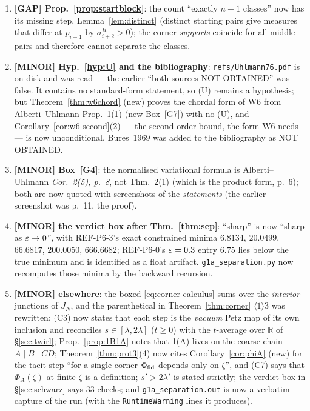 \documentclass[11pt]{article}
\newcommand{\Mob}{\operatorname{M\ddot ob}}
\theoremstyle{definition}\newtheorem{example}[theorem]{Example}
\begin{document}
\begin{enumerate}[leftmargin=2.2em]
 unitary on all of $H$ for every $g\in\Mob$ by Lemma~\ref{lem:moebius-inv}.
\item \textbf{[GAP] Prop.~\ref{prop:startblock}}: the count ``exactly $n-1$ classes'' now has its
 missing step, Lemma~\ref{lem:distinct} (distinct starting pairs give measures that differ at
 $p_{i+1}$ by $\sigma^R_{i+2}>0$); the corner \emph{supports} coincide for all middle pairs and
 therefore cannot separate the classes.
\item \textbf{[MINOR] Hyp.~\ref{hyp:U} and the bibliography}: \texttt{refs/Uhlmann76.pdf} is on
 disk and was read --- the earlier ``both sources NOT OBTAINED'' was false.  It contains no
 standard-form statement, so (U) remains a hypothesis; but Theorem~\ref{thm:w6chord} (new) proves
 the chordal form of W6 from Alberti--Uhlmann Prop.~1(1) (new Box~[G7]) with no (U), and
 Corollary~\ref{cor:w6-second}(2) --- the second-order bound, the form W6 needs --- is now
 unconditional.  Bures~1969 was added to the bibliography as NOT OBTAINED.
\item \textbf{[MINOR] Box~[G4]}: the normalised variational formula is Alberti--Uhlmann
 \emph{Cor.~2(5), p.~8}, not Thm.~2(1) (which is the product form, p.~6); both are now quoted with
 screenshots of the \emph{statements} (the earlier screenshot was p.~11, the proof).
\item \textbf{[MINOR] the verdict box after Thm.~\ref{thm:sep}}: ``sharp'' is now ``sharp as
 $\varepsilon\to0$'', with REF-P6-3's exact constrained minima $6.8134$, $20.0499$, $66.6817$,
 $200.0050$, $666.6682$; REF-P6-0's $\varepsilon=0.3$ entry $6.75$ lies below the true minimum and is
 identified as a float artifact.  \texttt{g1a\_separation.py} now recomputes those minima by the
 backward recursion.
\item \textbf{[MINOR] elsewhere}: the boxed \eqref{eq:corner-calculus} sums over the
 \emph{interior} junctions of $J_N$, and the parenthetical in Theorem~\ref{thm:corner}
 $\langle1\rangle3$ was rewritten; (C3) now states that each step is the \emph{vacuum} Petz map of
 its own inclusion and reconciles $s\in[\lambda,2\lambda]$ ($t\ge0$) with the $t$-average over
 $\mathbb R$ of \S\ref{sec:twirl}; Prop.~\ref{prop:1B1A} notes that 1(A) lives on the coarse chain
 $A\mid B\mid CD$; Theorem~\ref{thm:prot3}(4) now cites Corollary~\ref{cor:phiA} (new) for the
 tacit step ``for a single corner $\Phi_{\rm fid}$ depends only on $\zeta$'', and (C7) says that
 $\Phi_A(\zeta)$ at finite $\zeta$ is a definition; $s'>2\lambda'$ is stated strictly; the verdict
 box in \S\ref{sec:schwarz} says $33$ checks; and \texttt{g1a\_separation.out} is now a verbatim
 capture of the run (with the \texttt{RuntimeWarning} lines it produces).
\end{enumerate}
\end{document}
